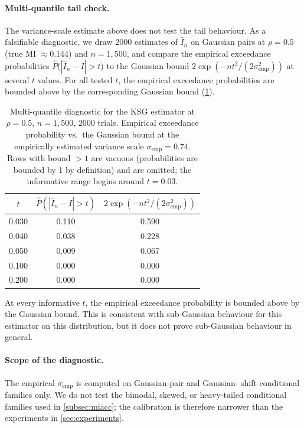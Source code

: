 \paragraph{Multi-quantile tail check.} The variance-scale estimate
above does not test the tail behaviour. As a falsifiable diagnostic,
we draw 2000 estimates of $\hat{I}_n$ on Gaussian pairs at
$\rho = 0.5$ (true MI $\approx 0.144$) and $n = 1{,}500$, and compare
the empirical exceedance probabilities
$\hat{P}\bigl(|\hat{I}_n - I| > t\bigr)$ to the Gaussian bound
$2 \exp(-n t^2 / (2 \sigma_{\mathrm{emp}}^2))$ at several $t$ values.
For all tested $t$, the empirical exceedance probabilities are
bounded above by the corresponding Gaussian bound
(\cref{tab:quantile}).

\begin{table}[ht]
\centering
\caption{Multi-quantile diagnostic for the KSG estimator at
$\rho = 0.5$, $n = 1{,}500$, 2000 trials. Empirical exceedance
probability vs.\ the Gaussian bound at the empirically estimated
variance scale $\sigma_{\mathrm{emp}} = 0.74$. Rows with bound $> 1$
are vacuous (probabilities are bounded by 1 by definition) and are
omitted; the informative range begins around $t = 0.03$.}
\label{tab:quantile}
\begin{tabular}{ccc}
\toprule
$t$ & $\hat{P}(|\hat{I}_n - I| > t)$ & $2\exp(-n t^2/(2\sigma_{\mathrm{emp}}^2))$ \\
\midrule
0.030 & 0.110 & 0.590 \\
0.040 & 0.038 & 0.228 \\
0.050 & 0.009 & 0.067 \\
0.100 & 0.000 & 0.000 \\
0.200 & 0.000 & 0.000 \\
\bottomrule
\end{tabular}
\end{table}

At every informative $t$, the empirical exceedance probability is
bounded above by the Gaussian bound. This is consistent with
sub-Gaussian behaviour for this estimator on this distribution, but
it does not prove sub-Gaussian behaviour in general.

\paragraph{Scope of the diagnostic.} The empirical
$\sigma_{\mathrm{emp}}$ is computed on Gaussian-pair and Gaussian-%
shift conditional families only. We do not test the bimodal, skewed, or heavy-tailed conditional
families used in \cref{subsec:miacc}; the calibration is
therefore narrower than the experiments in
\cref{sec:experiments}.

